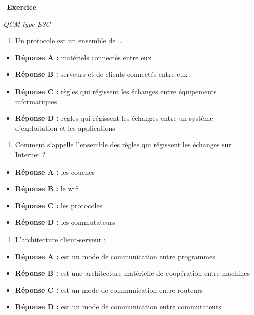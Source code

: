 \documentclass[
  11pt,
]{article}
\providecommand{\tightlist}{%
  \setlength{\itemsep}{0pt}\setlength{\parskip}{0pt}}
\newcounter{exo}
\newenvironment{exercice}[1]
{\par \medskip   \addtocounter{exo}{1} \noindent  
\begin{bclogo}[arrondi =0.1,   noborder = true, logo=\bccrayon, marge=4]{~\textbf{Exercice} \textbf{\theexo} {\itshape #1} }  \par}
{
\end{bclogo}
 \par \bigskip }
\newcounter{def}
\newcounter{prog}
\begin{document}
\begin{exercice}{}

\emph{QCM type E3C}

\begin{enumerate}
\def\labelenumi{\arabic{enumi}.}
\tightlist
\item
  Un protocole est un ensemble de \ldots{}
\end{enumerate}

\begin{itemize}
\tightlist
\item
  \textbf{Réponse A :} matériels connectés entre eux
\item
  \textbf{Réponse B :} serveurs et de clients connectés entre eux
\item
  \textbf{Réponse C :} règles qui régissent les échanges entre
  équipements informatiques
\item
  \textbf{Réponse D :} règles qui régissent les échanges entre un
  système d'exploitation et les applications
\end{itemize}

\begin{enumerate}
\def\labelenumi{\arabic{enumi}.}
\setcounter{enumi}{1}
\tightlist
\item
  Comment s'appelle l'ensemble des règles qui régissent les échanges sur
  Internet ?
\end{enumerate}

\begin{itemize}
\tightlist
\item
  \textbf{Réponse A :} les couches
\item
  \textbf{Réponse B :} le wifi
\item
  \textbf{Réponse C :} les protocoles
\item
  \textbf{Réponse D :} les commutateurs
\end{itemize}

\begin{enumerate}
\def\labelenumi{\arabic{enumi}.}
\setcounter{enumi}{2}
\tightlist
\item
  L'architecture client-serveur :
\end{enumerate}

\begin{itemize}
\tightlist
\item
  \textbf{Réponse A :} est un mode de communication entre programmes
\item
  \textbf{Réponse B :} est une architecture matérielle de coopération
  entre machines
\item
  \textbf{Réponse C :} est un mode de communication entre routeurs
\item
  \textbf{Réponse D :} est un mode de communication entre commutateurs
\end{itemize}

\end{exercice}
\end{document}
